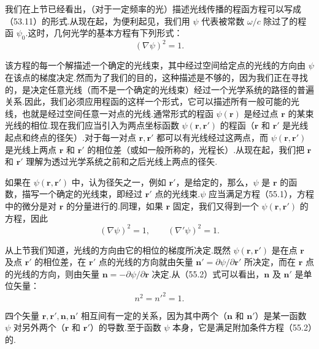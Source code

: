 我们在上节已经看出，（对于一定频率的光）描述光线传播的程函方程可以写成（53.11）的形式.从现在起，为便利起见，我们用 $\psi$ 代表被常数 $\omega/c$ 除过了的程函 $\psi_0$.这时，几何光学的基本方程有下列形式：
\begin{equation}
  (\nabla\psi)^2=1.
\end{equation}

该方程的每一个解描述一个确定的光线束，其中经过空间给定点的光线的方向由 $\psi$ 在该点的梯度决定.然而为了我们的目的，这种描述是不够的，因为我们正在寻找的，是决定任意光线（而不是一个确定的光线束）经过一个光学系统的路径的普遍关系.因此，我们必须应用程函的这样一个形式，它可以描述所有一般可能的光线，也就是经过空间任意一对点的光线.通常形式的程函 $\psi(\boldsymbol{r})$ 是经过点 $\boldsymbol{r}$ 的某束光线的相位.现在我们应当引入为两点坐标函数 $\psi(\boldsymbol{r},\boldsymbol{r}')$ 的程函（$\boldsymbol{r}$ 和 $\boldsymbol{r}'$ 是光线起点和终点的径矢）.对于每一对点 $\boldsymbol{r},\boldsymbol{r}'$ 都可以有光线经过这两点，而 $\psi(\boldsymbol{r},\boldsymbol{r}')$ 是光线上两点 $\boldsymbol{r}$ 和 $\boldsymbol{r}'$ 的相位差（或如一般所称的，光程长）.从现在起，我们把 $\boldsymbol{r}$ 和 $\boldsymbol{r}'$ 理解为透过光学系统之前和之后光线上两点的径矢.

如果在 $\psi(\boldsymbol{r},\boldsymbol{r}')$ 中，认为径矢之一，例如 $\boldsymbol{r}'$，是给定的，那么，$\psi$ 是 $\boldsymbol{r}$ 的函数，描写一个确定的光线束，即经过 $\boldsymbol{r}'$ 点的光线束.$\psi$ 应当满足方程（55.1），方程中的微分是对 $\boldsymbol{r}$ 的分量进行的.同理，如果 $\boldsymbol{r}$ 固定，我们又得到一个 $\psi(\boldsymbol{r},\boldsymbol{r}')$ 的方程，因此
\begin{equation}
  (\nabla\psi)^2=1,\qquad (\nabla'\psi)^2=1.
\end{equation}

从上节我们知道，光线的方向由它的相位的梯度所决定.既然 $\psi(\boldsymbol{r},\boldsymbol{r}')$ 是在点 $\boldsymbol{r}$ 及点 $\boldsymbol{r}'$ 的相位差，在 $\boldsymbol{r}'$ 点的光线的方向就由矢量 $\boldsymbol{n}'=\partial\psi/\partial\boldsymbol{r}'$ 所决定，而在 $\boldsymbol{r}$ 点的光线的方向，则由矢量 $\boldsymbol{n}=-\partial\psi/\partial\boldsymbol{r}$ 决定.从（55.2）式可以看出，$\boldsymbol{n}$ 及 $\boldsymbol{n}'$ 是单位矢量：
\begin{equation}
  n^2=n'^2=1.
\end{equation}

四个矢量 $\boldsymbol{r},\boldsymbol{r}',\boldsymbol{n},\boldsymbol{n}'$ 相互间有一定的关系，因为其中两个（$\boldsymbol{n}$ 和 $\boldsymbol{n}'$）是某一函数 $\psi$ 对另外两个（$\boldsymbol{r}$ 和 $\boldsymbol{r}'$）的导数.至于函数 $\psi$ 本身，它是满足附加条件方程（55.2）的.

